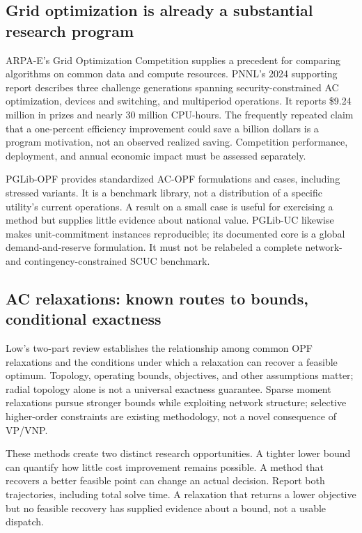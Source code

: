 \documentclass[11pt,letterpaper]{article}
\begin{document}
\subsection{Grid optimization is already a substantial research program}
ARPA-E's Grid Optimization Competition supplies a precedent for comparing algorithms on common data and compute resources. PNNL's 2024 supporting report describes three challenge generations spanning security-constrained AC optimization, devices and switching, and multiperiod operations. It reports \$9.24 million in prizes and nearly 30 million CPU-hours. The frequently repeated claim that a one-percent efficiency improvement could save a billion dollars is a program motivation, not an observed realized saving. Competition performance, deployment, and annual economic impact must be assessed separately.\cite{go}

PGLib-OPF provides standardized AC-OPF formulations and cases, including stressed variants. It is a benchmark library, not a distribution of a specific utility's current operations. A result on a small case is useful for exercising a method but supplies little evidence about national value.\cite{pglib} PGLib-UC likewise makes unit-commitment instances reproducible; its documented core is a global demand-and-reserve formulation. It must not be relabeled a complete network- and contingency-constrained SCUC benchmark.\cite{pglibuc}

\subsection{AC relaxations: known routes to bounds, conditional exactness}
Low's two-part review establishes the relationship among common OPF relaxations and the conditions under which a relaxation can recover a feasible optimum. Topology, operating bounds, objectives, and other assumptions matter; radial topology alone is not a universal exactness guarantee.\cite{low1,low2} Sparse moment relaxations pursue stronger bounds while exploiting network structure; selective higher-order constraints are existing methodology, not a novel consequence of VP/VNP.\cite{moment}

These methods create two distinct research opportunities. A tighter lower bound can quantify how little cost improvement remains possible. A method that recovers a better feasible point can change an actual decision. Report both trajectories, including total solve time. A relaxation that returns a lower objective but no feasible recovery has supplied evidence about a bound, not a usable dispatch.
\end{document}
